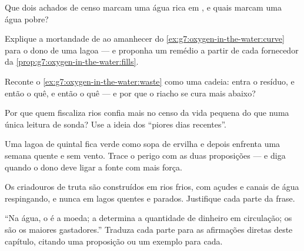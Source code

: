 \begin{exercise}[$\star$]\label{exo:g7:oxygen-in-the-water:6}
Que dois achados de censo marcam uma água rica em , e quais
marcam uma água pobre?
\end{exercise}

\begin{exercise}[$\star\star$]\label{exo:g7:oxygen-in-the-water:7}
Explique a mortandade de  ao amanhecer do
\cref{ex:g7:oxygen-in-the-water:curve} para o dono de uma lagoa --- e
proponha um remédio a partir de cada fornecedor da
\cref{prop:g7:oxygen-in-the-water:fills}.
\end{exercise}

\begin{exercise}[$\star\star$]\label{exo:g7:oxygen-in-the-water:8}
Reconte o \cref{ex:g7:oxygen-in-the-water:waste} como uma cadeia:
entra o resíduo, e então o quê, e então o quê --- e por que o riacho se
cura mais abaixo?
\end{exercise}

\begin{exercise}[$\star\star$]\label{exo:g7:oxygen-in-the-water:9}
Por que quem fiscaliza rios confia mais no censo da vida pequena do
que numa única leitura de sonda? Use a ideia dos ``piores dias
recentes''.
\end{exercise}

\begin{exercise}[$\star\star$]\label{exo:g7:oxygen-in-the-water:10}
Uma lagoa de quintal fica verde como sopa de ervilha e depois enfrenta
uma semana quente e sem vento. Trace o perigo com as duas proposições
--- e diga quando o dono deve ligar a fonte com mais força.
\end{exercise}

\begin{exercise}[$\star\star$]\label{exo:g7:oxygen-in-the-water:11}
Os criadouros de truta são construídos em rios frios, com açudes e
canais de água respingando, e nunca em lagos quentes e parados.
Justifique cada parte da frase.
\end{exercise}

\begin{exercise}[$\star\star\star$]\label{exo:g7:oxygen-in-the-water:12}
``Na água, o  é a moeda; a  determina a quantidade
de dinheiro em circulação; os  são os maiores
gastadores.'' Traduza cada parte para as afirmações diretas deste
capítulo, citando uma proposição ou um exemplo para cada.
\end{exercise}

